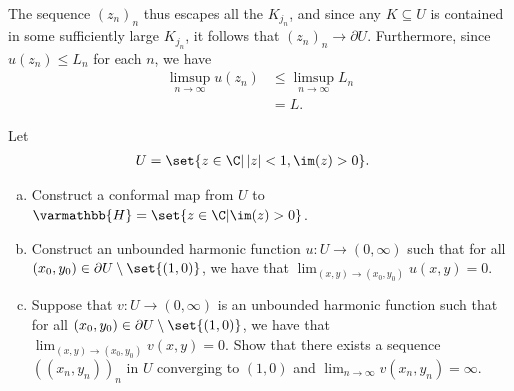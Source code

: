 \documentclass[10pt]{mypackage}
\renewcommand*{\mathbb}[1]{\varmathbb{#1}}
\begin{document}
\begin{solution}
\begin{enumerate}[(a)]
\begin{enumerate}[(i)]
          The sequence $\left( z_n \right)_n$ thus escapes all the $K_{j_n}$, and since any $K\subseteq U$ is contained in some sufficiently large $K_{j_n}$, it follows that $\left( z_n \right)_n\rightarrow \partial U$. Furthermore, since $u\left( z_n \right)\leq L_n$ for each $n$, we have
          \begin{align*}
            \limsup_{n\rightarrow\infty} u\left( z_n \right) &\leq \limsup_{n\rightarrow\infty}L_n\\
                                                             &= L.
          \end{align*}
      \end{enumerate}
  \end{enumerate}
\end{solution}
\begin{problem}[Problem 2]
  Let
  \begin{align*}
    U &= \set{z\in \C | \left\vert z \right\vert < 1,\im(z) > 0}.
  \end{align*}
  \begin{enumerate}[(a)]
    \item Construct a conformal map from $U$ to $ \mathbb{H} = \set{z\in\C | \im(z) > 0} $.
    \item Construct an unbounded harmonic function $u\colon U\rightarrow (0,\infty)$ such that for all $\left( x_0,y_0 \right)\in \partial U \setminus \set{(1,0)}$, we have that $\lim_{\left( x,y \right)\rightarrow \left( x_0,y_0 \right)} u\left( x,y \right) = 0$.
    \item Suppose that $v\colon U\rightarrow (0,\infty)$ is an unbounded harmonic function such that for all $\left( x_0,y_0 \right)\in \partial U\setminus \set{\left( 1,0 \right)}$, we have that $\lim_{\left( x,y \right)\rightarrow \left( x_0,y_0 \right)} v\left( x,y \right) = 0$. Show that there exists a sequence $\left( \left( x_n,y_n \right) \right)_n$ in $U$ converging to $\left( 1,0 \right)$ and $\lim_{n\rightarrow\infty}v\left( x_n,y_n \right) = \infty$.
  \end{enumerate}
\end{problem}
\end{document}
